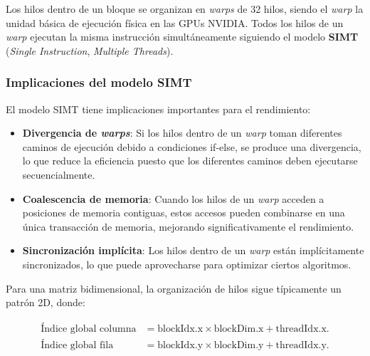         Los hilos dentro de un bloque se organizan en \textit{warps} de 32 hilos, siendo el \textit{warp} la unidad básica de ejecución física en las GPUs NVIDIA. Todos los hilos de un \textit{warp} ejecutan la misma instrucción simultáneamente siguiendo el modelo \textbf{SIMT} (\textit{Single Instruction}, \textit{Multiple Threads}).
        
        \subsubsection{Implicaciones del modelo SIMT}
    
            El modelo SIMT tiene implicaciones importantes para el rendimiento:
    
            \begin{itemize}
              
                \item \textbf{Divergencia de \textit{warps}}: Si los hilos dentro de un \textit{warp} toman diferentes caminos de ejecución debido a condiciones if-else, se produce una divergencia, lo que reduce la eficiencia puesto que los diferentes caminos deben ejecutarse secuencialmente.
               
                \item \textbf{Coalescencia de memoria}: Cuando los hilos de un \textit{warp} acceden a posiciones de memoria contiguas, estos accesos pueden combinarse en una única transacción de memoria, mejorando significativamente el rendimiento.
                
                \item \textbf{Sincronización implícita}: Los hilos dentro de un \textit{warp} están implícitamente sincronizados, lo que puede aprovecharse para optimizar ciertos algoritmos.
                
            \end{itemize}
            
            Para una matriz bidimensional, la organización de hilos sigue típicamente un patrón 2D, donde:
            
            \begin{align*}
                \text{Índice global columna} &= \text{blockIdx.x} \times \text{blockDim.x} + \text{threadIdx.x}.\\
                \text{Índice global fila} &= \text{blockIdx.y} \times \text{blockDim.y} + \text{threadIdx.y}.
            \end{align*}
            
